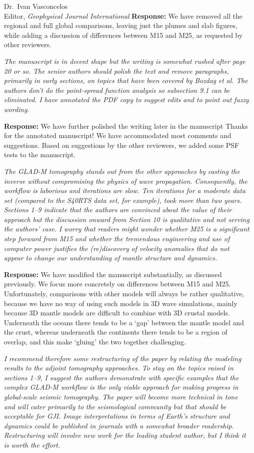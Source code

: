 \documentclass[11pt,a4paper]{letter}
\newcommand{\response}[1]{\textbf{Response:} #1}
\newcommand{\rev}[1]{{\it{#1}}}
\begin{document}
\begin{letter}{Dr.~Ivan Vasconcelos\\
Editor, \textit{Geophysical Journal International}}
\response{We have removed all the regional and full global comparisons, leaving just the plumes and slab figures, while adding a discussion of differences between M15 and M25, as requested by other reviewers.}

\rev{The manuscript is in decent shape but the writing is somewhat rushed after page 20 or so. The senior authors should polish the text and remove paragraphs, primarily in early sections, on topics that have been covered by Bozdag et al.
The authors don't do the point-spread function analysis so subsection 9.1 can be eliminated. I have annotated the PDF copy to suggest edits and to point out fuzzy wording.
}

\response{We have further polished the writing later in the manuscript
Thanks for the annotated manuscript! We have accommodated most comments and suggestions.
Based on suggestions by the other reviewers,
we added some PSF tests to the manuscript.}

\rev{The GLAD-M tomography stands out from the other approaches by casting the inverse without compromising the physics of wave propagation. Consequently, the workflow is laborious and iterations are slow. Ten iterations for a moderate data set (compared to the S40RTS data set, for example), took more than two years. Sections 1--9 indicate that the authors are convinced about the value of their approach but the discussion onward from Section 10 is qualitative and not serving the authors' case.
I worry that readers might wonder whether M25 is a significant step forward from M15 and whether the tremendous engineering and use of computer power justifies the (re)discovery of velocity anomalies that do not appear to change our understanding of mantle structure and dynamics.
}

\response{We have modified the manuscript substantially, as discussed previously. We focus more concretely on differences between M15 and M25.
Unfortunately,
comparisons with other models will always be rather qualitative, because we have no way of using such models in 3D wave simulations, mainly because 3D mantle models are difficult to combine with 3D crustal models. Underneath the oceans there tends to be a `gap' between the mantle model and the crust, whereas underneath the continents there tends to be a region of overlap, and this make `gluing' the two together challenging.}

\rev{I recommend therefore some restructuring of the paper by relating the modeling results to the adjoint tomography approaches. To stay on the topics raised in sections 1--9, I suggest the authors demonstrate with specific examples that the complex GLAD-M workflow is the only viable approach for making progress in global-scale seismic tomography. The paper will become more technical in tone and will cater primarily to the seismological community but that should be acceptable for GJI. Image interpretations in terms of Earth's structure and dynamics could be published in journals with a somewhat broader readership. Restructuring will involve new work for the leading student author, but I think it is worth the effort.
}


\end{letter}
\end{document}
